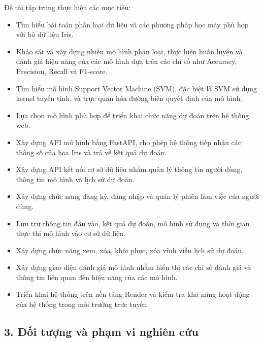 \documentclass[14pt]{extarticle}
\begin{document}
		  Đề tài tập trung thực hiện các mục tiêu:
		 \begin{itemize}
		 	\item Tìm hiểu bài toán phân loại dữ liệu và các phương pháp học máy phù hợp với bộ dữ liệu Iris.
		 	
		 	\item Khảo sát và xây dựng nhiều mô hình phân loại, thực hiện huấn luyện và đánh giá hiệu năng của các mô hình dựa trên các chỉ số như Accuracy, Precision, Recall và F1-score.
		 	
		 	\item Tìm hiểu mô hình Support Vector Machine (SVM), đặc biệt là SVM sử dụng kernel tuyến tính, và trực quan hóa đường biên quyết định của mô hình.
		 	
		 	\item Lựa chọn mô hình phù hợp để triển khai chức năng dự đoán trên hệ thống web.
		 	
		 	\item Xây dựng API mô hình bằng FastAPI, cho phép hệ thống tiếp nhận các thông số của hoa Iris và trả về kết quả dự đoán.
		 	
		 	\item Xây dựng API kết nối cơ sở dữ liệu nhằm quản lý thông tin người dùng, thông tin mô hình và lịch sử dự đoán.
		 	
		 	\item Xây dựng chức năng đăng ký, đăng nhập và quản lý phiên làm việc của người dùng.
		 	
		 	\item Lưu trữ thông tin đầu vào, kết quả dự đoán, mô hình sử dụng và thời gian thực thi mô hình vào cơ sở dữ liệu.
		 	
		 	\item Xây dựng chức năng xem, xóa, khôi phục, xóa vĩnh viễn lịch sử dự đoán.
		 	
		 	\item Xây dựng giao diện đánh giá mô hình nhằm hiển thị các chỉ số đánh giá và thông tin liên quan đến hiệu năng của các mô hình.
		 	
		 	\item Triển khai hệ thống trên nền tảng Render và kiểm tra khả năng hoạt động của hệ thống trong môi trường trực tuyến.
		 	
		 \end{itemize}
		 
\subsection*{3. Đối tượng và phạm vi nghiên cứu}
	
\end{document}
